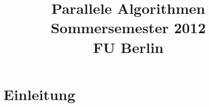 \documentclass[12pt,a4paper]{book}
\begin{document}
\title{Parallele Algorithmen \\ Sommersemester 2012 \\ FU Berlin}
\date{}
\maketitle
\chapter{Einleitung}



\end{document}
